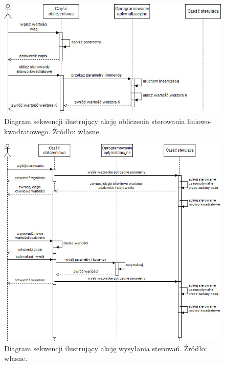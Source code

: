 \begin{figure}[hpt]
    \centering
    \includegraphics[width=\textwidth]{Grafika/communication-lqr}
    \caption{Diagram sekwencji ilustrujący akcję obliczenia sterowania liniowo-kwadratowego. Źródło: własne.}\label{fig:comm-lqr}
\end{figure}

\begin{figure}[hpt]
    \centering
    \includegraphics[width=\textwidth]{Grafika/communication-between-levels}
    \caption{Diagram sekwencji ilustrujący akcję wysyłania sterowań. Źródło: własne.}\label{fig:comm-send}
\end{figure}
